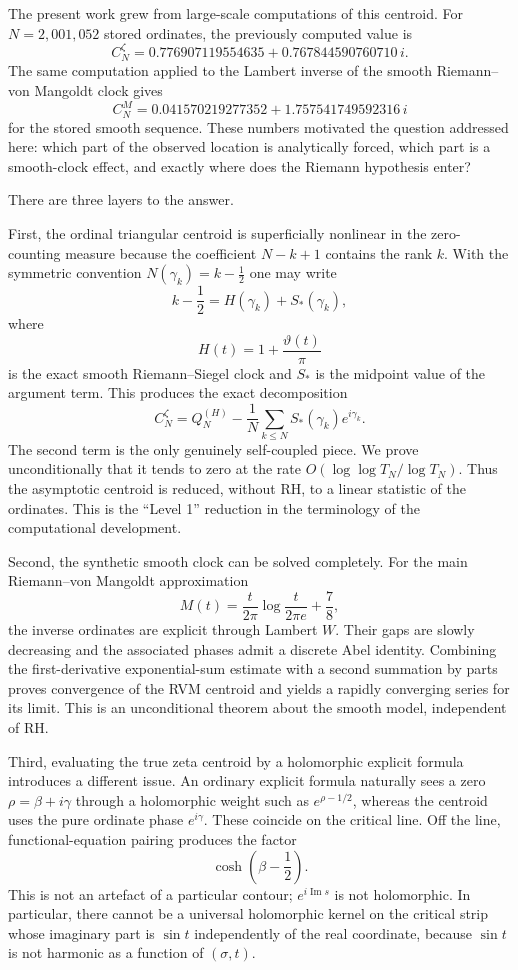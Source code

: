\documentclass[11pt]{article}
\theoremstyle{definition}
\theoremstyle{remark}
\begin{document}
The present work grew from large-scale computations of this centroid.  For $N=2{,}001{,}052$ stored ordinates, the previously computed value is
\[
C_N^{\zeta}
=0.776907119554635+0.767844590760710\,i.
\]
The same computation applied to the Lambert inverse of the smooth Riemann--von Mangoldt clock gives
\[
C_N^{M}
=0.041570219277352+1.757541749592316\,i
\]
for the stored smooth sequence.  These numbers motivated the question addressed here: which part of the observed location is analytically forced, which part is a smooth-clock effect, and exactly where does the Riemann hypothesis enter?

There are three layers to the answer.

First, the ordinal triangular centroid is superficially nonlinear in the zero-counting measure because the coefficient $N-k+1$ contains the rank $k$.  With the symmetric convention $N(\gamma_k)=k-\tfrac12$ one may write
\[
k-\frac12=H(\gamma_k)+S_*(\gamma_k),
\]
where
\[
H(t)=1+\frac{\vartheta(t)}{\pi}
\]
is the exact smooth Riemann--Siegel clock and $S_*$ is the midpoint value of the argument term.  This produces the exact decomposition
\[
C_N^{\zeta}
=Q_N^{(H)}-\frac1N\sum_{k\leq N}S_*(\gamma_k)e^{i\gamma_k}.
\]
The second term is the only genuinely self-coupled piece.  We prove unconditionally that it tends to zero at the rate $O(\log\log T_N/\log T_N)$.  Thus the asymptotic centroid is reduced, without RH, to a linear statistic of the ordinates.  This is the ``Level 1'' reduction in the terminology of the computational development.

Second, the synthetic smooth clock can be solved completely.  For the main Riemann--von Mangoldt approximation
\[
M(t)=\frac{t}{2\pi}\log\frac{t}{2\pi e}+\frac78,
\]
the inverse ordinates are explicit through Lambert $W$.  Their gaps are slowly decreasing and the associated phases admit a discrete Abel identity.  Combining the first-derivative exponential-sum estimate with a second summation by parts proves convergence of the RVM centroid and yields a rapidly converging series for its limit.  This is an unconditional theorem about the smooth model, independent of RH.

Third, evaluating the true zeta centroid by a holomorphic explicit formula introduces a different issue.  An ordinary explicit formula naturally sees a zero $\rho=\beta+i\gamma$ through a holomorphic weight such as $e^{\rho-1/2}$, whereas the centroid uses the pure ordinate phase $e^{i\gamma}$.  These coincide on the critical line.  Off the line, functional-equation pairing produces the factor
\[
\cosh\!\left(\beta-\frac12\right).
\]
This is not an artefact of a particular contour; $e^{i\operatorname{Im}s}$ is not holomorphic.  In particular, there cannot be a universal holomorphic kernel on the critical strip whose imaginary part is $\sin t$ independently of the real coordinate, because $\sin t$ is not harmonic as a function of $(\sigma,t)$.
\end{document}
